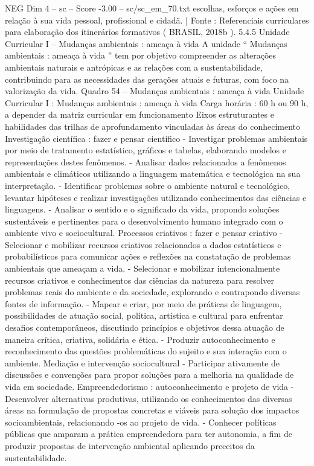 \begin{textsample}{NEG Dim 4 – sc – Score -3.00 – sc/sc\_em\_70.txt}
escolhas, esforços e ações em relação à sua vida pessoal, profissional e cidadã. | Fonte : Referenciais curriculares para elaboração dos itinerários formativos ( BRASIL, 2018b ). 5.4.5 Unidade Curricular I – Mudanças ambientais : ameaça à vida A unidade “ Mudanças ambientais : ameaça à vida ” tem por objetivo compreender as alterações ambientais naturais e antrópicas e as relações com a sustentabilidade, contribuindo para as necessidades das gerações atuais e futuras, com foco na valorização da vida.
Quadro 54 – Mudanças ambientais : ameaça à vida Unidade Curricular I : Mudanças ambientais : ameaça à vida Carga horária : 60 h ou 90 h, a depender da matriz curricular em funcionamento Eixos estruturantes e habilidades das trilhas de aprofundamento vinculadas às áreas do conhecimento Investigação científica : fazer e pensar científico - Investigar problemas ambientais por meio de tratamento estatístico, gráficos e tabelas, elaborando modelos e representações destes fenômenos. - Analisar dados relacionados a fenômenos ambientais e climáticos utilizando a linguagem matemática e tecnológica na sua interpretação. - Identificar problemas sobre o ambiente natural e tecnológico, levantar hipóteses e realizar investigações utilizando conhecimentos das ciências e linguagens. - Analisar o sentido e o significado da vida, propondo soluções sustentáveis e pertinentes para o desenvolvimento humano integrado com o ambiente vivo e sociocultural.
Processos criativos : fazer e pensar criativo - Selecionar e mobilizar recursos criativos relacionados a dados estatísticos e probabilísticos para comunicar ações e reflexões na constatação de problemas ambientais que ameaçam a vida. - Selecionar e mobilizar intencionalmente recursos criativos e conhecimentos das ciências da natureza para resolver problemas reais do ambiente e da sociedade, explorando e contrapondo diversas fontes de informação. - Mapear e criar, por meio de práticas de linguagem, possibilidades de atuação social, política, artística e cultural para enfrentar desafios contemporâneos, discutindo princípios e objetivos dessa atuação de maneira crítica, criativa, solidária e ética. - Produzir autoconhecimento e reconhecimento das questões problemáticas do sujeito e sua interação com o ambiente.
Mediação e intervenção sociocultural - Participar ativamente de discussões e convenções para propor soluções para a melhoria na qualidade de vida em sociedade.
Empreendedorismo : autoconhecimento e projeto de vida - Desenvolver alternativas produtivas, utilizando os conhecimentos das diversas áreas na formulação de propostas concretas e viáveis para solução dos impactos socioambientais, relacionando -os ao projeto de vida. - Conhecer políticas públicas que amparam a prática empreendedora para ter autonomia, a fim de produzir propostas de intervenção ambiental aplicando preceitos da sustentabilidade.

\end{textsample}
